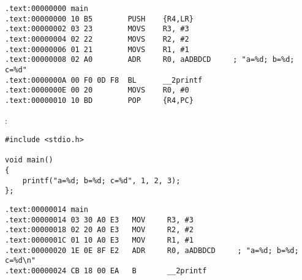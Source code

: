 \myparagraph{\OptimizingKeilVI (\ThumbMode)}

\begin{lstlisting}[caption=\OptimizingKeilVI (\ThumbMode)]
.text:00000000 main
.text:00000000 10 B5        PUSH    {R4,LR}
.text:00000002 03 23        MOVS    R3, #3
.text:00000004 02 22        MOVS    R2, #2
.text:00000006 01 21        MOVS    R1, #1
.text:00000008 02 A0        ADR     R0, aADBDCD     ; "a=%d; b=%d; c=%d"
.text:0000000A 00 F0 0D F8  BL      __2printf
.text:0000000E 00 20        MOVS    R0, #0
.text:00000010 10 BD        POP     {R4,PC}
\end{lstlisting}


\label{ARM_B_to_printf}

 :

\begin{lstlisting}
#include <stdio.h>

void main()
{
	printf("a=%d; b=%d; c=%d", 1, 2, 3);
};
\end{lstlisting}


\begin{lstlisting}[caption=\OptimizingKeilVI (\ARMMode)]
.text:00000014 main
.text:00000014 03 30 A0 E3   MOV     R3, #3
.text:00000018 02 20 A0 E3   MOV     R2, #2
.text:0000001C 01 10 A0 E3   MOV     R1, #1
.text:00000020 1E 0E 8F E2   ADR     R0, aADBDCD     ; "a=%d; b=%d; c=%d\n"
.text:00000024 CB 18 00 EA   B       __2printf
\end{lstlisting}

